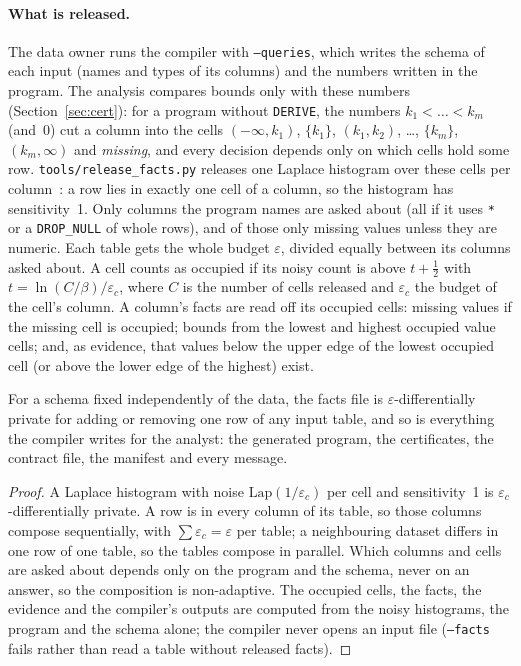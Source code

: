 \paragraph{What is released.} The data owner runs the compiler with \texttt{--queries}, which writes
the schema of each input (names and types of its columns) and the numbers written in the program. The
analysis compares bounds only with these numbers (Section~\ref{sec:cert}): for a program without
\texttt{DERIVE}, the numbers $k_1 < \dots < k_m$ (and~0) cut a column into the cells
$(-\infty,k_1)$, $\{k_1\}$, $(k_1,k_2)$, \ldots, $\{k_m\}$, $(k_m,\infty)$ and \emph{missing}, and every
decision depends only on which cells hold some row. \texttt{tools/release\_facts.py} releases one
Laplace histogram over these cells per column~\cite{dwork2014}: a row lies in exactly one cell of a
column, so the histogram has sensitivity~1. Only columns the program names are asked about (all if it
uses \texttt{*} or a \texttt{DROP\_NULL} of whole rows), and of those only missing values unless they
are numeric. Each table gets the whole budget $\varepsilon$, divided equally between its columns
asked about. A cell counts as occupied if its noisy count is above $t + \frac12$ with
$t = \ln(C/\beta)/\varepsilon_c$, where $C$ is the number of cells released and $\varepsilon_c$ the
budget of the cell's column. A column's facts are read off its occupied cells: missing values if the missing
cell is occupied; bounds from the lowest and highest occupied value cells; and, as evidence, that values
below the upper edge of the lowest occupied cell (or above the lower edge of the highest) exist.

\begin{theorem}[Privacy]\label{thm:private}
For a schema fixed independently of the data, the facts file is $\varepsilon$-differentially private for
adding or removing one row of any input table, and so is everything the compiler writes for the
analyst: the generated program, the certificates, the contract file, the manifest and every message.
\end{theorem}
\begin{proof}
A Laplace histogram with noise $\mathrm{Lap}(1/\varepsilon_c)$ per cell and sensitivity~1 is
$\varepsilon_c$-differentially private. A row is in every column of its table, so those columns compose
sequentially, with $\sum \varepsilon_c = \varepsilon$ per table; a neighbouring dataset differs in one
row of one table, so the tables compose in parallel. Which columns and cells are asked about depends
only on the program and the schema, never on an answer, so the composition is non-adaptive. The occupied cells, the facts, the evidence and the compiler's outputs are computed from
the noisy histograms, the program and the schema alone; the compiler never opens an input file
(\texttt{--facts} fails rather than read a table without released facts).
\end{proof}

